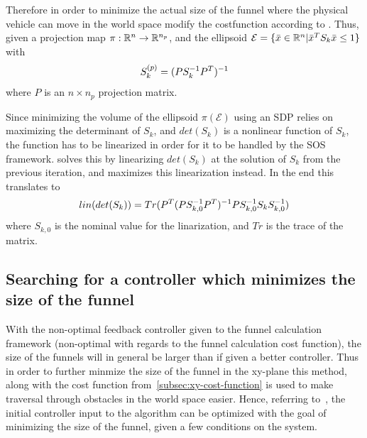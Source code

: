 Therefore in order to minimize the actual size of the funnel where the physical
vehicle can move in the world space modify the costfunction according to
\cite{majumdarFunnelLibrariesRealtime2017}. Thus, given a projection map \(\pi :
\mathbb{R}^n \rightarrow \mathbb{R}^{n_p}\), and the ellipsoid \(\mathcal{E} = \lbrace\bar{x} \in
  \mathbb{R}^n | \bar{x}^TS_{k}\bar{x} \leq 1\rbrace\) with
\[
  S_k^{(p)} = \lparen PS_k^{-1}P^T\rparen^{-1}
\]
where \(P\) is an \(n\times n_p\) projection matrix.

Since minimizing the volume of the ellipsoid \(\pi(\mathcal{E})\) using an \ac{SDP}
relies on maximizing the determinant of \(S_k\), and \(det(S_k)\) is a nonlinear
function of \(S_k\), the function has to be linearized in order for it to be
handled by the \ac{SOS}
framework. \cite[Majumdar]{majumdarFunnelLibrariesRealtime2017} solves this by
linearizing \(det(S_k)\) at the solution of \(S_k\) from the previous iteration,
and maximizes this linearization instead. In the end this translates to
\[
  \mathnormal{lin}\lparen det\lparen S_k\rparen\rparen =
  Tr\lparen P^T\lparen PS_{k,0}^{-1}P^T\rparen^{-1}PS_{k,0}^{-1}S_kS_{k,0}^{-1}\rparen
\]
where \(S_{k,0}\) is the nominal value for the linarization, and \(Tr\) is the
trace of the matrix.

\subsection{Searching for a controller which minimizes the size of the funnel}

With the non-optimal feedback controller given to the funnel calculation
framework (non-optimal with regards to the funnel calculation cost function),
the size of the funnels will in general be larger than if given a better
controller. Thus in order to further minmize the size of the funnel in the
xy-plane this method, along with the cost function
from~\ref{subsec:xy-cost-function} is used to make traversal through obstacles
in the world space easier. Hence, referring to~\cite[Majumdar.sec~4.3.2
(Feedback control synthesis)]{majumdarFunnelLibrariesRealtime2017}, the initial
controller input to the algorithm can be optimized with the goal of minimizing
the size of the funnel, given a few conditions on the system.

